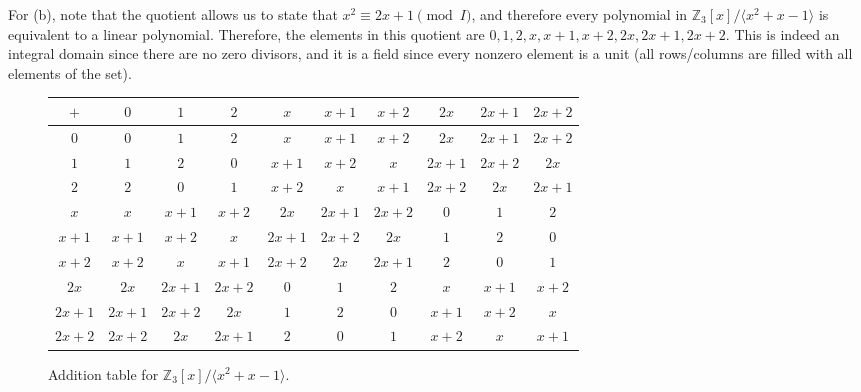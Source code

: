 \begin{solution}
    For (b), note that the quotient allows us to state that $x^2 \equiv 2x + 1 \pmod{I}$, and therefore every polynomial in $\mathbb{Z}_3 [x] / \langle x^2 + x - 1 \rangle$ is equivalent to a linear polynomial. Therefore, the elements in this quotient are $0, 1, 2, x, x + 1, x + 2, 2x, 2x + 1, 2x + 2$. This is indeed an integral domain since there are no zero divisors, and it is a field since every nonzero element is a unit (all rows/columns are filled with all elements of the set). 

    \begin{figure}[H]
      \centering
      \begin{tabular}{c|ccccccccc}
        $+$ & $0$ & $1$ & $2$ & $x$ & $x+1$ & $x+2$ & $2x$ & $2x+1$ & $2x+2$ \\
        \hline
        $0$ & $0$ & $1$ & $2$ & $x$ & $x+1$ & $x+2$ & $2x$ & $2x+1$ & $2x+2$ \\
        $1$ & $1$ & $2$ & $0$ & $x+1$ & $x+2$ & $x$ & $2x+1$ & $2x+2$ & $2x$ \\
        $2$ & $2$ & $0$ & $1$ & $x+2$ & $x$ & $x+1$ & $2x+2$ & $2x$ & $2x+1$ \\
        $x$ & $x$ & $x+1$ & $x+2$ & $2x$ & $2x+1$ & $2x+2$ & $0$ & $1$ & $2$ \\
        $x+1$ & $x+1$ & $x+2$ & $x$ & $2x+1$ & $2x+2$ & $2x$ & $1$ & $2$ & $0$ \\
        $x+2$ & $x+2$ & $x$ & $x+1$ & $2x+2$ & $2x$ & $2x+1$ & $2$ & $0$ & $1$ \\
        $2x$ & $2x$ & $2x+1$ & $2x+2$ & $0$ & $1$ & $2$ & $x$ & $x+1$ & $x+2$ \\
        $2x+1$ & $2x+1$ & $2x+2$ & $2x$ & $1$ & $2$ & $0$ & $x+1$ & $x+2$ & $x$ \\
        $2x+2$ & $2x+2$ & $2x$ & $2x+1$ & $2$ & $0$ & $1$ & $x+2$ & $x$ & $x+1$ \\
      \end{tabular}
      \caption{Addition table for $\mathbb{Z}_3[x]/ \langle x^2 + x - 1\rangle$.}
    \end{figure}


\end{solution}
